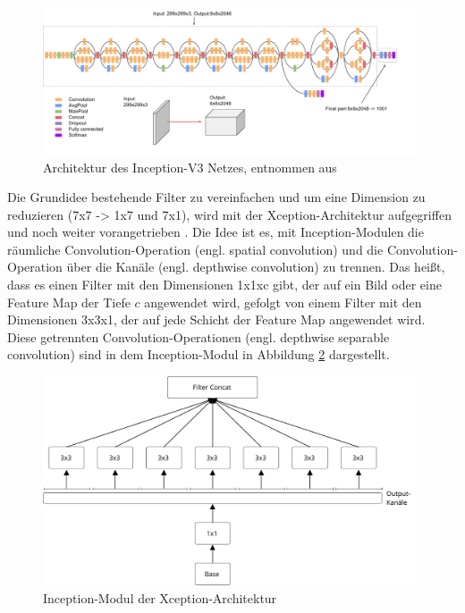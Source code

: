 \begin{figure}[h]
\centering
\includegraphics[scale=0.4]{images/inception_v3.png}
\caption[Architektur des Inception-V3 Netzes]{Architektur des Inception-V3 Netzes, entnommen aus \cite{google2018inceptionv3}}
\label{fig_inception_v3}
\end{figure}

Die Grundidee bestehende Filter zu vereinfachen und um eine Dimension zu reduzieren (7x7 -> 1x7 und 7x1), wird mit der Xception-Architektur aufgegriffen und noch weiter vorangetrieben \cite{chollet2017xception}. Die Idee ist es, mit Inception-Modulen die räumliche Convolution-Operation (engl. spatial convolution) und die Convolution-Operation über die Kanäle (engl. depthwise convolution) zu trennen. Das heißt, dass es einen Filter mit den Dimensionen 1x1xc gibt, der auf ein Bild oder eine Feature Map der Tiefe $c$ angewendet wird, gefolgt von einem Filter mit den Dimensionen 3x3x1, der auf jede Schicht der Feature Map angewendet wird. Diese getrennten Convolution-Operationen (engl. depthwise separable convolution) sind in dem Inception-Modul in Abbildung \ref{fig_inception_extreme} dargestellt.

\begin{figure}[h]
\centering
\includegraphics[scale=0.5]{images/inception_extreme.pdf}
\caption[Inception-Modul der Xception-Architektur]{Inception-Modul der Xception-Architektur \cite{chollet2017xception}}
\label{fig_inception_extreme}
\end{figure}

